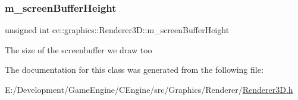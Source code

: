 \subsubsection{\texorpdfstring{m\+\_\+screen\+Buffer\+Height}{m\_screenBufferHeight}}
{\footnotesize\ttfamily unsigned int ce\+::graphics\+::\+Renderer3\+D\+::m\+\_\+screen\+Buffer\+Height\hspace{0.3cm}{\ttfamily [protected]}}

The size of the screenbuffer we draw too 

The documentation for this class was generated from the following file\+:\begin{DoxyCompactItemize}
\item 
E\+:/\+Development/\+Game\+Engine/\+C\+Engine/src/\+Graphics/\+Renderer/\hyperlink{_renderer3_d_8h}{Renderer3\+D.\+h}\end{DoxyCompactItemize}
